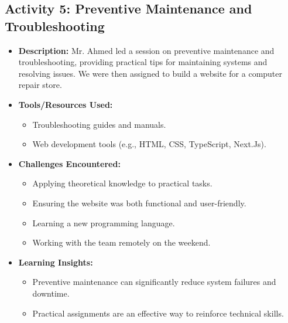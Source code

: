 \documentclass{article}
\begin{document}
\subsection*{Activity 5: Preventive Maintenance and Troubleshooting}
\begin{itemize}
    \item \textbf{Description:} Mr. Ahmed led a session on preventive maintenance and troubleshooting, providing practical tips for maintaining systems and resolving issues. We were then assigned to build a website for a computer repair store.
    \item \textbf{Tools/Resources Used:}
    \begin{itemize}
        \item Troubleshooting guides and manuals.
        \item Web development tools (e.g., HTML, CSS, TypeScript, Next.Js).
    \end{itemize}
    \item \textbf{Challenges Encountered:}
    \begin{itemize}
        \item Applying theoretical knowledge to practical tasks.
        \item Ensuring the website was both functional and user-friendly.
        \item Learning a new programming language.
        \item Working with the team remotely on the weekend.
    \end{itemize}
    \item \textbf{Learning Insights:}
    \begin{itemize}
        \item Preventive maintenance can significantly reduce system failures and downtime.
        \item Practical assignments are an effective way to reinforce technical skills.
    \end{itemize}
\end{itemize}
\end{document}

